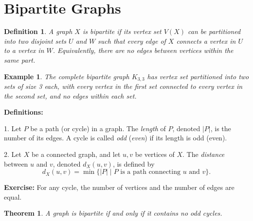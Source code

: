 \documentclass[12pt,a4paper,openany]{book}
\newtheorem{theorem}{Theorem}[section]
\newtheorem{definition}{Definition}[section]
\newtheorem{example}{Example}[section]
\begin{document}
\section*{Bipartite Graphs}

\begin{definition}
A graph $X$ is \emph{bipartite} if its vertex set $V(X)$ can be partitioned into two disjoint sets $U$ and $W$ such that every edge of $X$ connects a vertex in $U$ to a vertex in $W$.  
Equivalently, there are no edges between vertices within the same part.
\end{definition}

\begin{example}
The complete bipartite graph $K_{3,3}$ has vertex set partitioned into two sets of size 3 each, with every vertex in the first set connected to every vertex in the second set, and no edges within each set.

\begin{center}
\end{center}
\end{example}





\textbf{Definitions:}

1. Let $P$ be a path (or cycle) in a graph. The \emph{length} of $P$, denoted $|P|$, is the number of its edges. A cycle is called \emph{odd} (\emph{even}) if its length is odd (even).  


2. Let $X$ be a connected graph, and let $u,v$ be vertices of $X$. The \emph{distance} between $u$ and $v$, denoted $d_X(u,v)$, is defined by
\[
d_X(u,v) = \min \{ |P| \mid P \text{ is a path connecting } u \text{ and } v \}.
\]

\bigskip

\textbf{Exercise:} For any cycle, the number of vertices and the number of edges are equal.


\begin{theorem}
A graph is bipartite if and only if it contains no odd cycles.
\end{theorem}
\end{document}
